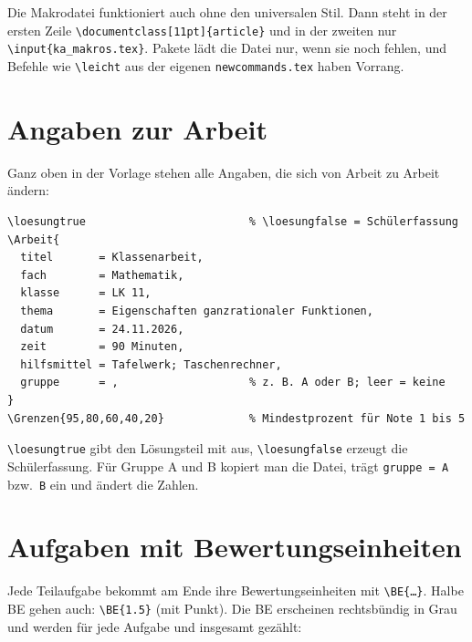 \begin{lstlisting}[style=latex]



\end{lstlisting}

Die Makrodatei funktioniert auch ohne den universalen Stil. Dann steht in der ersten Zeile \texttt{\textbackslash documentclass[11pt]\{article\}} und in der zweiten nur \texttt{\textbackslash input\{ka\_makros.tex\}}. Pakete lädt die Datei nur, wenn sie noch fehlen, und Befehle wie \texttt{\textbackslash leicht} aus der eigenen \texttt{newcommands.tex} haben Vorrang.



\section{Angaben zur Arbeit}

Ganz oben in der Vorlage stehen alle Angaben, die sich von Arbeit zu Arbeit ändern:

\begin{lstlisting}[style=latex]
\loesungtrue                         % \loesungfalse = Schülerfassung
\Arbeit{
  titel       = Klassenarbeit,
  fach        = Mathematik,
  klasse      = LK 11,
  thema       = Eigenschaften ganzrationaler Funktionen,
  datum       = 24.11.2026,
  zeit        = 90 Minuten,
  hilfsmittel = Tafelwerk; Taschenrechner,
  gruppe      = ,                    % z. B. A oder B; leer = keine
}
\Grenzen{95,80,60,40,20}             % Mindestprozent für Note 1 bis 5
\end{lstlisting}

\texttt{\textbackslash loesungtrue} gibt den Lösungsteil mit aus, \texttt{\textbackslash loesungfalse} erzeugt die Schülerfassung. Für Gruppe A und B kopiert man die Datei, trägt \texttt{gruppe = A} bzw.\ \texttt{B} ein und ändert die Zahlen.



\section{Aufgaben mit Bewertungseinheiten}

Jede Teilaufgabe bekommt am Ende ihre Bewertungseinheiten mit \texttt{\textbackslash BE\{\dots\}}. Halbe BE gehen auch: \texttt{\textbackslash BE\{1.5\}} (mit Punkt). Die BE erscheinen rechtsbündig in Grau und werden für jede Aufgabe und insgesamt gezählt:


